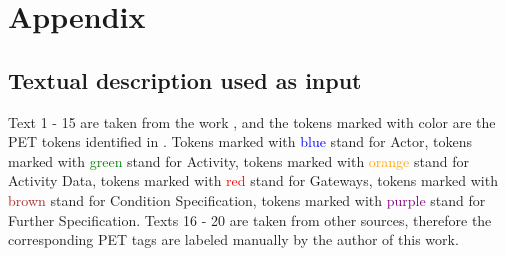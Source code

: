 \chapter{Appendix}

\section{Textual description used as input}
\label{appendix:text}
Text 1 - 15 are taken from the work \cite{t2m_1_main}, and the tokens marked with color are the PET tokens identified in \cite{pet_dataset}. Tokens marked with \textcolor{blue}{blue} stand for Actor, tokens marked with \textcolor{green}{green} stand for Activity, tokens marked with \textcolor{orange}{orange} stand for Activity Data, tokens marked with \textcolor{red}{red} stand for Gateways, tokens marked with \textcolor{brown}{brown} stand for Condition Specification, tokens marked with \textcolor{purple}{purple} stand for Further Specification. Texts 16 - 20 are taken from other sources, therefore the corresponding PET tags are labeled manually by the author of this work.

